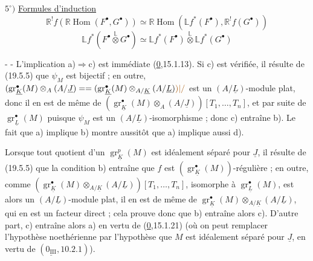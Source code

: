 $5^\circ)$ \uline{Formules d'induction}
\[
\boxed{\mathbb{R}^!f(\mathbb{R}\operatorname{Hom}(F^\bullet,G^\bullet))
\simeq \mathbb{R}\operatorname{Hom}(\mathbb{L}f^*(F^\bullet),\mathbb{R}^!f(G^\bullet))}
\]
\[
\boxed{\mathbb{L}f^*(F^\bullet\mathbin{\overset{\mathbb{L}}{\otimes}}G^\bullet)
\simeq \mathbb{L}f^*(F^\bullet)\mathbin{\overset{\mathbb{L}}{\otimes}}\mathbb{L}f^*(G^\bullet)}
\]

-  -
L'implication a)$\Rightarrow$c) est immédiate  (\uline{0},15.1.13). Si c) est vérifiée, il résulte de (19.5.5) que $\psi_M$ est bijectif ; en outre,
$(\operatorname{gr}_{\underline K}^\bullet(M)\otimes_A(A/\underline J)=
=(\operatorname{gr}_{\underline K}^\bullet(M)\otimes_{A/\underline K}(A/\underline L)\unsure{)|/}$ est un $(A/\underline L)$-module plat, donc il en est de même de
$(\operatorname{gr}_{\underline K}^\bullet(M)\otimes_A(A/\underline J))[T_1,\ldots,T_n]$, et par suite de $\operatorname{gr}_{\underline L}^\bullet(M)$ puisque $\psi_M$ est un $(A/\underline L)$-isomorphisme ; donc c) entraîne b). Le fait que a) implique b) montre aussitôt que a) implique aussi d).

Lorsque tout quotient d'un $\operatorname{gr}_{\underline K}^p(M)$ est idéalement séparé pour $\underline J$, il résulte de (19.5.5) que la condition b) entraîne que $f$ est $(\operatorname{gr}_{\underline K}^\bullet(M))$-régulière ; en outre, comme
$(\operatorname{gr}_{\underline K}^\bullet(M)\otimes_{A/\underline K}(A/\underline L))[T_1,\ldots,T_n]$, isomorphe à $\operatorname{gr}_{\underline L}^\bullet(M)$, est alors un $(A/\underline L)$-module plat,  il en est  de même de
$\operatorname{gr}_{\underline K}^\bullet(M)\otimes_{A/\underline K}(A/\underline L)$, qui en est un facteur direct ; cela prouve donc que b) entraîne alors c). D'autre part, c) entraîne alors a) en vertu de (\uline{0},15.1.21) (où on peut remplacer l'hypothèse noethérienne par l'hypothèse que $M$ est idéalement séparé pour $\underline J$, en vertu de $(\underline{0_{\mathrm{III}}},10.2.1)$).

